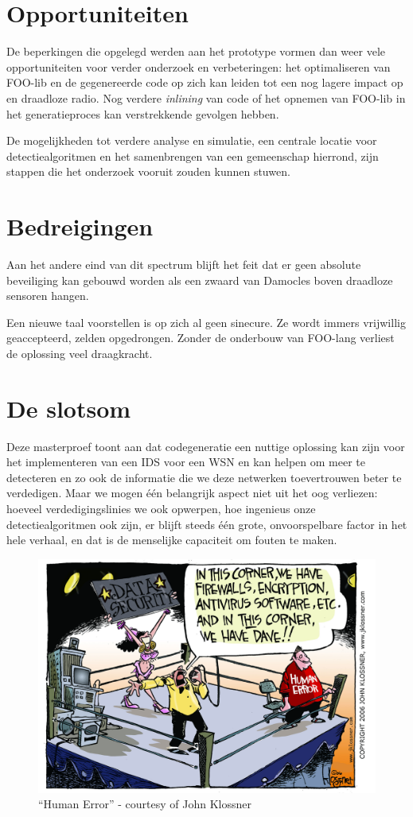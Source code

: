 \section{Opportuniteiten}
\label{section:opportunities}

De beperkingen die opgelegd werden aan het prototype vormen dan weer vele
opportuniteiten voor verder onderzoek en verbeteringen: het optimaliseren van
FOO-lib en de gegenereerde code op zich kan leiden tot een nog lagere impact op
\mcu en draadloze radio. Nog verdere \emph{inlining} van code of het opnemen
van FOO-lib in het generatieproces kan verstrekkende gevolgen hebben.

De mogelijkheden tot verdere analyse en simulatie, een centrale locatie voor
detectiealgoritmen en het samenbrengen van een gemeenschap hierrond, zijn
stappen die het onderzoek vooruit zouden kunnen stuwen.

\vspace{-2mm}

\section{Bedreigingen}
\label{section:threaths}

Aan het andere eind van dit spectrum blijft het feit dat er geen absolute
beveiliging kan gebouwd worden als een zwaard van Damocles boven draadloze
sensoren hangen.

Een nieuwe taal voorstellen is op zich al geen sinecure. Ze wordt immers
vrijwillig geaccepteerd, zelden opgedrongen. Zonder de onderbouw van FOO-lang
verliest de oplossing veel draagkracht.

\vspace{-2mm}

\section{De slotsom}
\label{section:bottom-line}

Deze masterproef toont aan dat codegeneratie een nuttige oplossing kan zijn
voor het implementeren van een IDS voor een WSN en kan helpen om meer te
detecteren en zo ook de informatie die we deze netwerken toevertrouwen beter te
verdedigen. Maar we mogen \'e\'en belangrijk aspect niet uit het oog verliezen:
hoeveel verdedigingslinies we ook opwerpen, hoe ingenieus onze
detectiealgoritmen ook zijn, er blijft steeds \'e\'en grote, onvoorspelbare
factor in het hele verhaal, en dat is de menselijke capaciteit om fouten te
maken.

\begin{figure}[ht]
  \centering
  \includegraphics[width=0.72\linewidth]{resources/cartoon_human_error.jpg}
  \caption[``Human Error'']{``Human Error'' - courtesy of John Klossner}
\end{figure}
